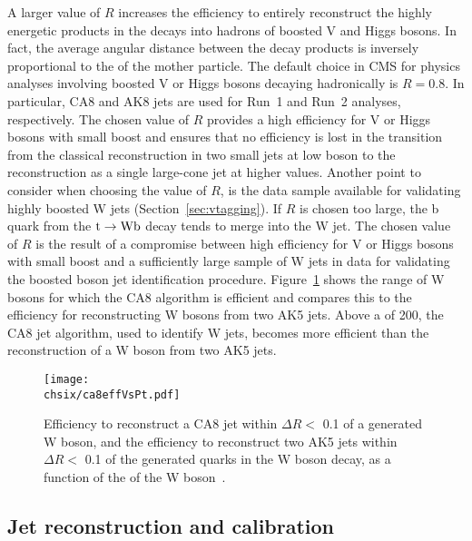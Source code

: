 A larger value of $R$ increases the efficiency to entirely reconstruct the highly energetic products in the decays into hadrons of boosted V and Higgs bosons.
In fact, the average angular distance between the decay products is inversely proportional to the \pt of the mother particle. The default choice in CMS for physics analyses involving boosted V or Higgs bosons decaying hadronically is $R = 0.8$. In particular, CA8 and AK8 jets are used for Run~1 and Run~2 analyses, respectively. The chosen value of $R$ provides a high efficiency for V or Higgs bosons with small boost and ensures that no efficiency is lost in the transition from the classical reconstruction in two small jets at low boson \pt to the reconstruction as a single large-cone jet at higher values. Another point to consider when choosing the value of $R$, is the \ttbar data sample available for validating highly boosted W jets (Section~\ref{sec:vtagging}). If $R$ is chosen too large, the b quark from the $\mathrm{t}\to\mathrm{W}\mathrm{b}$ decay tends to merge into the W jet. The chosen value of $R$ is the result of a compromise between high efficiency for V or Higgs bosons with small boost and a sufficiently large sample of W jets in \ttbar data for validating the boosted boson jet identification procedure. Figure~\ref{fig:ca8effVsPt} shows the \pt range of W bosons for which the CA8 algorithm is efficient and compares this to the efficiency for reconstructing W bosons from two AK5 jets. Above a \pt of 200\GeV, the CA8 jet algorithm, used to identify W jets, becomes more efficient than the reconstruction of a W boson from two AK5 jets.

\begin{figure}[!htb]
 \begin{center}
  \texttt{[image: \\chsix/ca8effVsPt.pdf]}
 \end{center}
 \caption{Efficiency to reconstruct a CA8 jet within $\Delta R <$ 0.1 of a generated W boson, and the efficiency to reconstruct two AK5 jets within $\Delta R <$ 0.1 of the generated quarks in the W boson decay, as a function of the \pt of the W boson~\cite{Khachatryan:2014vla}.}
 \label{fig:ca8effVsPt}
\end{figure}

\subsection{Jet reconstruction and calibration}\label{subsec:jetsreco} %

